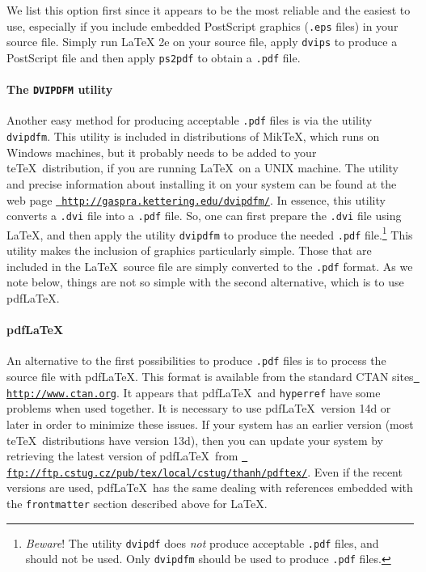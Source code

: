 \documentclass{endm}
\begin{document}
We list this option first since it appears to be the most reliable and
the easiest to use, especially if you include embedded PostScript
graphics (\texttt{.eps} files) in your source file. Simply run \LaTeX
2e on your source file, apply \texttt{dvips} to produce a PostScript
file and then apply \texttt{ps2pdf} to obtain a \texttt{.pdf} file.

\paragraph{The \texttt{DVIPDFM} utility}

Another easy method for producing acceptable \texttt{.pdf} files is
via the utility \texttt{dvipdfm}. This utility is included in
distributions of Mik\TeX, which runs on Windows machines, but it
probably needs to be added to your te\TeX\ distribution, if you are
running \LaTeX\ on a UNIX machine. The utility and precise information
about installing it on your system can be found at the web page
\href{http://gaspra.kettering.edu/dvipdfm/}{\tt
http://gaspra.kettering.edu/dvipdfm/}. In essence, this utility
converts a \texttt{.dvi} file into a \texttt{.pdf} file. So, one can
first prepare the \texttt{.dvi} file using \LaTeX, and then apply the
utility \texttt{dvipdfm} to produce the needed \texttt{.pdf}
file.\footnote{ \emph{Beware}! The utility \texttt{dvipdf} does
\emph{not} produce acceptable \texttt{.pdf} files, and should not be
used. Only \texttt{dvipdfm} should be used to produce \texttt{.pdf}
files.} This utility makes the inclusion of graphics particularly
simple. Those that are included in the \LaTeX\ source file are simply
converted to the \texttt{.pdf} format. As we note below, things are
not so simple with the second alternative, which is to use pdf\LaTeX.

\paragraph{pdf\LaTeX}
An alternative to the first possibilities to produce \texttt{.pdf}
files is to process the source file with pdf\LaTeX. This format is
available from the standard CTAN sites \href{http://www.ctan.org}{\tt
http://www.ctan.org}. It appears that pdf\LaTeX\ and \texttt{hyperref}
have some problems when used together. It is necessary to use
pdf\LaTeX\ version 14d or later in order to minimize these issues. If
your system has an earlier version (most te\TeX\ distributions have
version 13d), then you can update your system by retrieving the latest
version of pdf\LaTeX\ from
\href{ftp://ftp.cstug.cz/pub/tex/local/cstug/thanh/pdftex/}{\tt
ftp://ftp.cstug.cz/pub/tex/local/cstug/thanh/pdftex/}. Even if the
recent versions are used, pdf\LaTeX\ has the same dealing with
references embedded with the \texttt{frontmatter} section described
above for \LaTeX.
\end{document}

